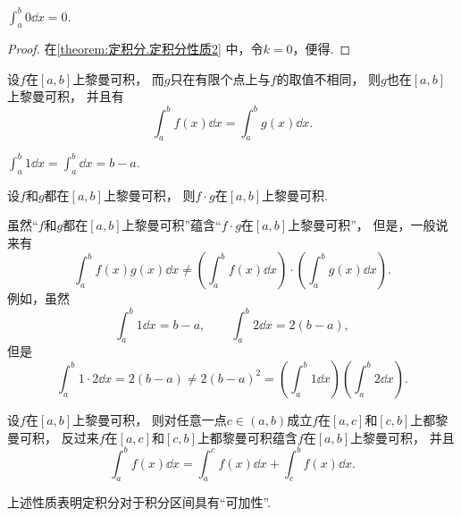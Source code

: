 \begin{corollary}\label{theorem:定积分.定积分性质2推论1}
\(\int_a^b 0 \dd{x} = 0\).
\begin{proof}
在\cref{theorem:定积分.定积分性质2} 中，令\(k=0\)，便得.
\end{proof}
\end{corollary}

\begin{corollary}
设\(f\)在\([a,b]\)上黎曼可积，
而\(g\)只在有限个点上与\(f\)的取值不相同，
则\(g\)也在\([a,b]\)上黎曼可积，
并且有\[
	\int_a^b f(x) \dd{x}
	= \int_a^b g(x) \dd{x}.
\]
\end{corollary}

\begin{property}\label{theorem:定积分.定积分性质4}
\(\int_a^b 1 \dd{x}
= \int_a^b \dd{x}
= b-a\).
\end{property}

\begin{property}\label{theorem:定积分.乘积可积性}
设\(f\)和\(g\)都在\([a,b]\)上黎曼可积，
则\(f \cdot g\)在\([a,b]\)上黎曼可积.
\end{property}
\begin{remark}
虽然“\(f\)和\(g\)都在\([a,b]\)上黎曼可积”蕴含“\(f \cdot g\)在\([a,b]\)上黎曼可积”，
但是，一般说来有\[
	\int_a^b f(x) g(x) \dd{x}
	\neq
	\left(
		\int_a^b f(x) \dd{x}
	\right) \cdot \left(
		\int_a^b g(x) \dd{x}
	\right).
\]
例如，虽然\[
	\int_a^b 1 \dd{x} = b-a, \qquad
	\int_a^b 2 \dd{x} = 2(b-a),
\]
但是\[
	\int_a^b 1\cdot2 \dd{x} = 2(b-a)
	\neq
	2(b-a)^2 = \left(\int_a^b 1 \dd{x}\right) \left(\int_a^b 2 \dd{x}\right).
\]
\end{remark}

\begin{property}\label{theorem:定积分.定积分性质3}
设\(f\)在\([a,b]\)上黎曼可积，
则对任意一点\(c\in(a,b)\)成立\(f\)在\([a,c]\)和\([c,b]\)上都黎曼可积，
反过来\(f\)在\([a,c]\)和\([c,b]\)上都黎曼可积蕴含\(f\)在\([a,b]\)上黎曼可积，
并且\begin{equation}
	\int_a^b f(x) \dd{x}
	= \int_a^c f(x) \dd{x}
	+ \int_c^b f(x) \dd{x}.
\end{equation}
\end{property}
上述性质表明定积分对于积分区间具有“可加性”.

